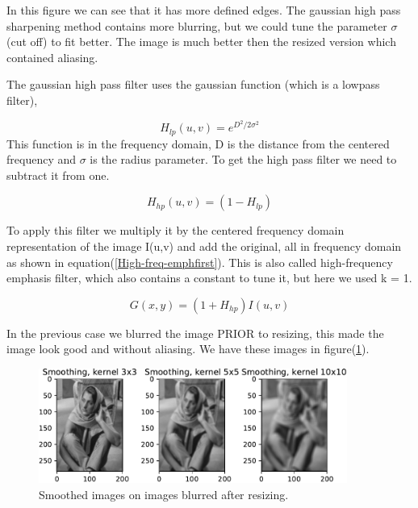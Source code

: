 {In this figure we can see that it has more defined edges. The gaussian high pass sharpening method contains more blurring, but we could tune the parameter $\sigma$(cut off) to fit better. The image is much better then the resized version which contained aliasing.

The gaussian high pass filter uses the gaussian function (which is a lowpass filter),

\begin{equation}
    H_{lp}(u,v) = e^{D^2/2\sigma^2}
    \label{gausslowp}
\end{equation}
This function is in the frequency domain, D is the distance from the centered frequency and $\sigma$ is the radius parameter. To get the high pass filter we need to subtract it from one.

\begin{equation}
    H_{hp}(u,v) = (1 - H_{lp})
    \label{gausshighp}
\end{equation}

To apply this filter we multiply it by the centered frequency domain representation of the image I(u,v) and add the original, all in frequency domain as shown in equation(\ref{High-freq-emphfirst}). This is also called high-frequency emphasis filter, which also contains a constant to tune it, but here we used k = 1.

\begin{equation}
    G(x,y) =  (1 + H_{hp})I(u,v)
    \label{High-freq-emphfirst}
\end{equation}


In the previous case we blurred the image PRIOR to resizing, this made the image look good and without aliasing. We have these images in figure(\ref{smooth2}).

\begin{figure}[!htb]
    {\centering
        \includegraphics[width=0.90\textwidth]{smoothafter.pdf}
        \caption{Smoothed images on images blurred after resizing.}
        \label{smooth2}
    \par}
    \end{figure}

}
